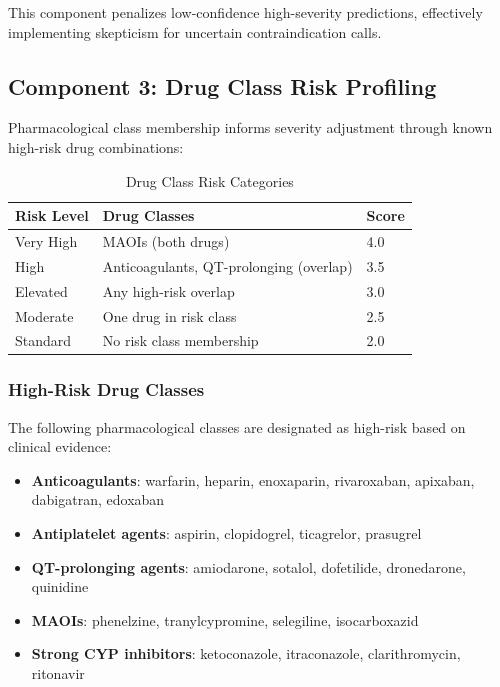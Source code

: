 \documentclass[11pt,a4paper]{article}
\begin{document}
This component penalizes low-confidence high-severity predictions, effectively implementing skepticism for uncertain contraindication calls.

\subsection{Component 3: Drug Class Risk Profiling}

Pharmacological class membership informs severity adjustment through known high-risk drug combinations:

\begin{table}[H]
\centering
\caption{Drug Class Risk Categories}
\label{tab:drug_classes}
\begin{tabular}{@{}lll@{}}
\toprule
\textbf{Risk Level} & \textbf{Drug Classes} & \textbf{Score} \\
\midrule
Very High & MAOIs (both drugs) & 4.0 \\
High & Anticoagulants, QT-prolonging (overlap) & 3.5 \\
Elevated & Any high-risk overlap & 3.0 \\
Moderate & One drug in risk class & 2.5 \\
Standard & No risk class membership & 2.0 \\
\bottomrule
\end{tabular}
\end{table}

\subsubsection{High-Risk Drug Classes}

The following pharmacological classes are designated as high-risk based on clinical evidence:

\begin{itemize}
    \item \textbf{Anticoagulants}: warfarin, heparin, enoxaparin, rivaroxaban, apixaban, dabigatran, edoxaban
    \item \textbf{Antiplatelet agents}: aspirin, clopidogrel, ticagrelor, prasugrel
    \item \textbf{QT-prolonging agents}: amiodarone, sotalol, dofetilide, dronedarone, quinidine
    \item \textbf{MAOIs}: phenelzine, tranylcypromine, selegiline, isocarboxazid
    \item \textbf{Strong CYP inhibitors}: ketoconazole, itraconazole, clarithromycin, ritonavir
\end{itemize}
\end{document}
